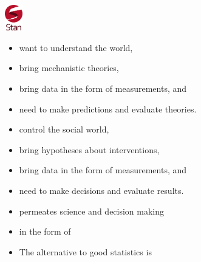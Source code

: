 \documentclass[10pt]{report}
\begin{document}
\sf%
\mbox{ }
\\[12pt]
\spc{\LARGE\bfseries \color{MidnightBlue}{Taking Uncertainty Seriously}}
\\[4pt]
\\[36pt]
\noindent
\spc{\Large\bfseries \color{MidnightBlue}{Bob Carpenter}}
\\[2pt]
\vfill
\noindent
{} \hfill
\hfill
\includegraphics[width=0.3in]{img/new-logo.png}


\begin{itemize}
\item want to understand the world,
\item bring mechanistic theories,
\item bring data in the form of measurements, and
\item need to make predictions and evaluate theories.
\end{itemize}

\begin{itemize}
\item control the social world,
\item bring hypotheses about interventions,
\item bring data in the form of measurements, and
\item need to make decisions and evaluate results.
\end{itemize}

\begin{itemize}
\item permeates science and decision making
\item in the form of
\item The alternative to good statistics is
\end{itemize}
\end{document}
